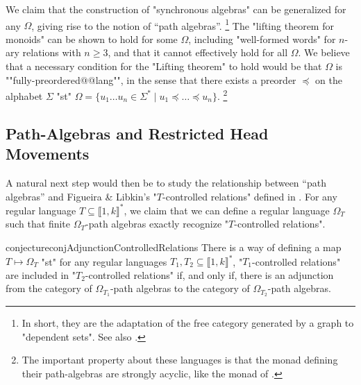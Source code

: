 We claim that the construction of "synchronous algebras"
can be generalized for any $\Omega$, giving rise to the notion of ``path algebras''.%
\footnote{In short, they are the adaptation of
the free category generated by a graph to "dependent sets". See also .}
The "lifting theorem for monoids" can be shown to hold for some $\Omega$, including "well-formed words" for $n$-ary relations with $n\geq 3$, and that it cannot effectively hold for all $\Omega$.
We believe that a necessary condition for the "Lifting theorem" to hold
would be that $\Omega$ is ""fully-preordered@@lang"",
in the sense that there exists a preorder $\preccurlyeq$ on the alphabet $\Sigma$
"st" $\Omega = \{u_1 \dotsc u_n \in \Sigma^* \mid u_1 \preccurlyeq \dotsc \preccurlyeq u_n\}$.%
\footnote{The important property about these languages is that
the monad defining their path-algebras are strongly acyclic, like the
monad of .}

\subsection{Path-Algebras and Restricted Head Movements}

A natural next step would then be to study the relationship between ``path algebras'' and
Figueira \& Libkin's "$T$-controlled relations" defined
in .
For any regular language $T \subseteq \lBrack 1,k\rBrack^*$, we claim that we can define a regular language $\Omega_T$ such that finite $\Omega_T$-path algebras exactly recognize 
"$T$-controlled relations".

\begin{restatable}{conjecture}{conjAdjunctionControlledRelations}
	\label{conj:adjunction-controlled-relations}
	There is a way of defining a map $T \mapsto \Omega_T$ "st"
	for any regular languages $T_1, T_2 \subseteq \lBrack 1,k \rBrack^*$,
	"$T_1$-controlled relations" are included in "$T_2$-controlled relations" if, and only if,
	there is an adjunction from the category of $\Omega_{T_1}$-path algebras to the category of
	$\Omega_{T_2}$-path algebras.
\end{restatable}


